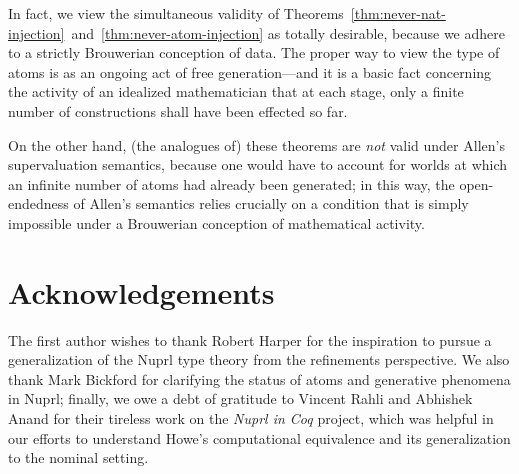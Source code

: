 \documentclass[11pt]{article}
\theoremstyle{definition}
\theoremstyle{notation}
\theoremstyle{remark}
\numberwithin{equation}{section}
\begin{document}
In fact, we view the simultaneous validity of
Theorems~\ref{thm:never-nat-injection}~and~\ref{thm:never-atom-injection} as
totally desirable, because we adhere to a strictly Brouwerian conception of
data. The proper way to view the type of atoms is as an ongoing act of free
generation---and it is a basic fact concerning the activity of an idealized
mathematician that at each stage, only a finite number of constructions shall
have been effected so far.

On the other hand, (the analogues of) these theorems are \emph{not} valid under
Allen's supervaluation semantics, because one would have to account for worlds
at which an infinite number of atoms had already been generated; in this way,
the open-endedness of Allen's semantics relies crucially on a condition that is
simply impossible under a Brouwerian conception of mathematical activity.

\section*{Acknowledgements}

The first author wishes to thank Robert Harper for the inspiration to pursue a
generalization of the Nuprl type theory from the refinements perspective. We
also thank Mark Bickford for clarifying the status of atoms and generative
phenomena in Nuprl; finally, we owe a debt of gratitude to Vincent Rahli and
Abhishek Anand for their tireless work on the \emph{Nuprl in Coq} project,
which was helpful in our efforts to understand Howe's computational equivalence
and its generalization to the nominal setting.

\ifdraft{}{
  \newpage
  \nocite{maclane:1971}
  
  
}
\end{document}
